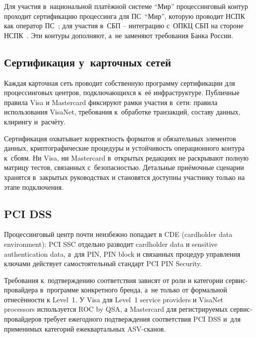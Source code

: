 Для участия в~национальной платёжной системе \enquote{Мир}
процессинговый контур проходит сертификацию процессинга
для ПС~\enquote{Мир}, которую проводит НСПК как оператор
ПС~\cite{nspk-mir-rules};
для участия в~СБП -- интеграцию с~ОПКЦ СБП на стороне
НСПК~\cite{cbr-sbp-rules}. Эти контуры дополняют, а~не
заменяют требования Банка России.

\subsection*{Сертификация у~карточных сетей}

Каждая карточная сеть проводит собственную программу
сертификации для процессинговых центров, подключающихся
к~её инфраструктуре. Публичные правила Visa и Mastercard
фиксируют рамки участия в~сети: правила использования VisaNet,
требования к~обработке транзакций, составу данных, клирингу
и~расчёту.~\cite{visa-core-rules,mc-rules,mc-tpr}

Сертификация охватывает корректность форматов и обязательных
элементов данных, криптографические процедуры и устойчивость
операционного контура к~сбоям. Ни Visa, ни Mastercard в~открытых
редакциях не раскрывают полную матрицу тестов, связанных
с~безопасностью. Детальные приёмочные сценарии хранятся
в~закрытых руководствах и становятся доступны участнику только
на этапе подключения.~\cite{visa-core-rules,mc-rules}

\subsection*{PCI DSS}

Процессинговый центр почти неизбежно попадает в CDE
(cardholder data environment): PCI SSC отдельно разводит
cardholder data и sensitive authentication data, а~для PIN,
PIN block и связанных процедур управления ключами действует
самостоятельный стандарт PCI PIN
Security.~\cite{pci-scoping-guidance,pci-faq-1335,pci-pin-security}

Требования к~подтверждению соответствия зависят
от роли и категории сервис-провайдера в~программе конкретного
бренда, а~не только от формальной отнесённости к Level~1. У Visa для Level~1 service providers и VisaNet
processors используется ROC by QSA, а Mastercard для
регистрируемых сервис-провайдеров требует ежегодного
подтверждения соответствия PCI DSS и~для применимых
категорий ежеквартальных
ASV-сканов.~\cite{visa-pci-validation-best-practice,mc-service-provider-categories-pci,pci-faq-1234-asv}
